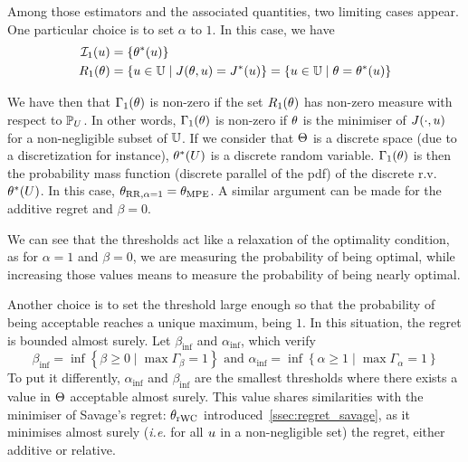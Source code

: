 \documentclass[../../Main_ManuscritThese.tex]{subfiles}
\begin{document}
  
  Among those estimators and the associated quantities, two limiting
  cases appear. One particular choice is to set $\alpha$ to $1$. In
  this case, we have
\begin{align}
  \mathcal{I}_{1}(u) &= \{\theta^*(u)\} \\
  R_1(\theta) &= \left\{u\in\mathbb{U} \mid J(\theta, u) = J^*(u)\right\} = \left\{u\in\mathbb{U} \mid \theta = \theta^*(u)\right\}
\end{align}

We have then that $\Gamma_1(\theta)$ is non-zero if the set $R_1(\theta)$
has non-zero measure with respect to $\mathbb{P}_{U}$. In other words,
$\Gamma_1(\theta)$ is non-zero if $\theta$ is the minimiser of
$J(\cdot,u)$ for a non-negligible subset of $\mathbb{U}$.  If we
consider that $\Theta$ is a discrete space (due to a discretization
for instance), $\theta^*(U)$ is a discrete random
variable. $\Gamma_1(\theta)$ is then the probability mass function
(discrete parallel of the pdf) of the discrete r.v.\ $\theta^*(U)$.  In
this case, ${\theta}_{\mathrm{RR, \alpha=1}}= {\theta}_{\mathrm{MPE}}$.  A
similar argument can be made for the additive regret and $\beta=0$.

We can see that the thresholds act like a relaxation of the optimality
condition, as for $\alpha=1$ and $\beta=0$, we are measuring the
probability of being optimal, while increasing those values means to
measure the probability of being nearly optimal.


Another choice is to set the threshold large enough so that the
probability of being acceptable reaches a unique maximum, being
$1$. In this situation, the regret is bounded almost surely.  Let
$\beta_{\inf{}}$ and $\alpha_{\inf{}}$, which verify
\begin{equation}
  \beta_{\inf{}}=\inf \left\{\beta \geq 0 \mid \max \Gamma_{\beta} = 1\right\} \text{ and }\alpha_{\inf{}}= \inf \left\{\alpha \geq 1 \mid \max \Gamma_{\alpha} = 1\right\}
\end{equation}
To put it differently, $\alpha_{\inf{}}$ and $\beta_{\inf{}}$ are the
smallest thresholds where there exists a value in $\Theta$ acceptable
almost surely. This value shares similarities with the minimiser of
Savage's regret: ${\theta}_{\mathrm{rWC}}$
introduced~\cref{ssec:regret_savage}, as it minimises almost surely
(\emph{i.e.} for all $u$ in a non-negligible set) the regret, either
additive or relative.



\end{document}
